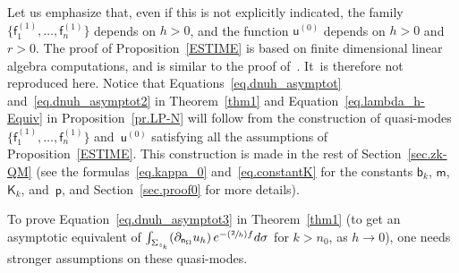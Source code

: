 \documentclass[10pt]{amsart}
\newcommand{\Psfrac}[2]{(\sfrac{#1}{#2})}
\theoremstyle{plain}
\theoremstyle{definition}
\begin{document}
Let us emphasize that, even if this is not explicitly indicated, the
family $\{\mathsf f_1^{(1)}, \ldots,
\mathsf f_n^{(1)}\} $ depends on $h>0$, and the function $\mathsf u^{(0)}$ depends on $h>0$ and
$r>0$. The proof of Proposition~\ref{ESTIME} is based on finite dimensional
linear algebra computations, and is similar to the proof
of~\cite[Th.\,5]{DLLN-saddle1}. It~is
therefore not reproduced here. Notice that
Equations~\eqref{eq.dnuh_asymptot} and~\eqref{eq.dnuh_asymptot2} in
Theorem~\ref{thm1} and Equation~\eqref{eq.lambda_h-Equiv} in
Proposition~\ref{pr.LP-N} will follow from the construction of
quasi-modes $\{\mathsf f_1^{(1)}, \ldots, \mathsf f_n^{(1)}\} $ and~$\mathsf u^{(0)}$ satisfying all the assumptions of
Proposition~\ref{ESTIME}. This construction is made in the rest of Section~\ref{sec.zk-QM} (see
the formulas~\eqref{eq.kappa_0} and~\eqref{eq.constantK} for the
constants $\mathsf b_k$, $\mathsf m$, $\mathsf K_k$, and~$\mathsf
p$, and Section~\ref{sec.proof0} for more details).

To prove Equation~\eqref{eq.dnuh_asymptot3} in Theorem~\ref{thm1} (\ie to get an asymptotic equivalent of $\int_{\Sigma_{z_k}} (\partial_{\mathsf n_\Omega} u_h)\, e^{-\Psfrac{2}{h}f} d\sigma$ for $k>n_0$, as $h\to 0$), one needs stronger assumptions on these quasi-modes.
\end{document}
